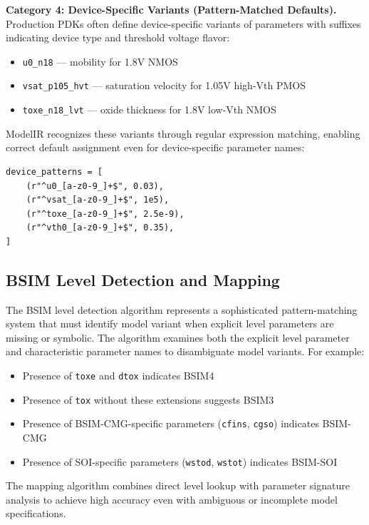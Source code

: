 \documentclass[10pt,twocolumn]{article}
\begin{document}
\textbf{Category 4: Device-Specific Variants (Pattern-Matched Defaults).} Production PDKs often define device-specific variants of parameters with suffixes indicating device type and threshold voltage flavor:
\begin{itemize}
\item \texttt{u0\_n18} --- mobility for 1.8V NMOS
\item \texttt{vsat\_p105\_hvt} --- saturation velocity for 1.05V high-Vth PMOS
\item \texttt{toxe\_n18\_lvt} --- oxide thickness for 1.8V low-Vth NMOS
\end{itemize}

ModelIR recognizes these variants through regular expression matching, enabling correct default assignment even for device-specific parameter names:

\begin{lstlisting}[style=python]
device_patterns = [
    (r"^u0_[a-z0-9_]+$", 0.03),
    (r"^vsat_[a-z0-9_]+$", 1e5),
    (r"^toxe_[a-z0-9_]+$", 2.5e-9),
    (r"^vth0_[a-z0-9_]+$", 0.35),
]
\end{lstlisting}

\subsection{BSIM Level Detection and Mapping}

The BSIM level detection algorithm represents a sophisticated pattern-matching system that must identify model variant when explicit level parameters are missing or symbolic. The algorithm examines both the explicit level parameter and characteristic parameter names to disambiguate model variants. For example:
\begin{itemize}
\item Presence of \texttt{toxe} and \texttt{dtox} indicates BSIM4
\item Presence of \texttt{tox} without these extensions suggests BSIM3
\item Presence of BSIM-CMG-specific parameters (\texttt{cfins}, \texttt{cgso}) indicates BSIM-CMG
\item Presence of SOI-specific parameters (\texttt{wstod}, \texttt{wstot}) indicates BSIM-SOI
\end{itemize}

The mapping algorithm combines direct level lookup with parameter signature analysis to achieve high accuracy even with ambiguous or incomplete model specifications.
\end{document}
